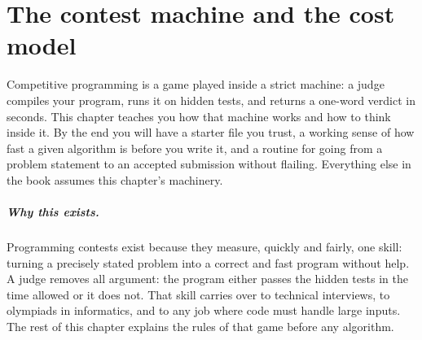 \chapter{The contest machine and the cost model}\label{ch:machine}

Competitive programming is a game played inside a strict machine: a judge
compiles your program, runs it on hidden tests, and returns a one-word verdict
in seconds. This chapter teaches you how that machine works and how to think
inside it. By the end you will have a starter file you trust, a working sense
of how fast a given algorithm is before you write it, and a routine for going
from a problem statement to an accepted submission without flailing. Everything
else in the book assumes this chapter's machinery.

\paragraph{Why this exists.} Programming contests exist because they measure, quickly and fairly, one
skill: turning a precisely stated problem into a correct and fast program without help. A judge
removes all argument: the program either passes the hidden tests in the time allowed or it does not.
That skill carries over to technical interviews, to olympiads in informatics, and to any job where code
must handle large inputs. The rest of this chapter explains the rules of that game before any algorithm.

